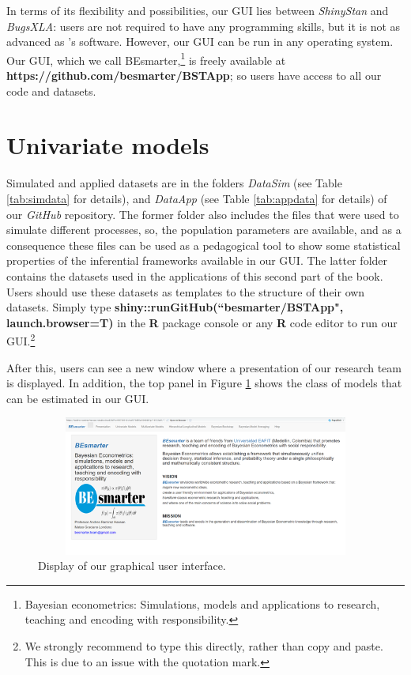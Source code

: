 In terms of its flexibility and possibilities, our GUI lies between \textit{ShinyStan} and \textit{BugsXLA}: users are not required to have any programming skills, but it is not as advanced as \cite{Karabatsos2016}'s software. However, our GUI can be run in any operating system. Our GUI, which we call BEsmarter,\footnote{Bayesian econometrics: Simulations, models and applications to research, teaching and encoding with responsibility.} is freely available at \textbf{https://github.com/besmarter/BSTApp}; so users have access to all our code and datasets.

\section{Univariate models}\label{secGUI2}
Simulated and applied datasets are in the folders \textit{DataSim} (see Table \ref{tab:simdata} for details), and \textit{DataApp} (see Table \ref{tab:appdata} for details) of our \textit{GitHub} repository. The former folder also includes the files that were used to simulate different processes, so, the population parameters are available, and as a consequence these files can be used as a pedagogical tool to show some statistical properties of the inferential frameworks available in our GUI. The latter folder contains the datasets used in the applications of this second part of the book. Users should use these datasets as templates to the structure of their own datasets. Simply type \textbf{shiny::runGitHub(``besmarter/BSTApp", launch.browser=T)} in the \textbf{R} package console or any \textbf{R} code editor to run our GUI.\footnote{We strongly recommend to type this directly, rather than copy and paste. This is due to an issue with the quotation mark.}

After this, users can see a new window where a presentation of our research team is displayed. In addition, the top panel in Figure \ref{fig61} shows the class of models that can be estimated in our GUI.

\begin{figure}
	\includegraphics[width=340pt, height=130pt]{Chapters/chapterGUI/figures/Figure1.png}
	\caption[List of figure caption goes here]{Display of our graphical user interface.}\label{fig61}
\end{figure}

